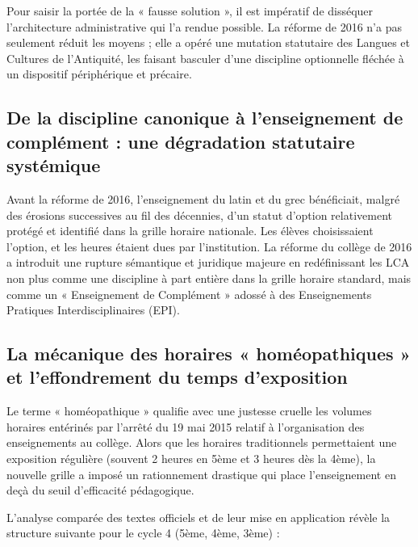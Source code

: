 Pour saisir la portée de la « fausse solution », il est impératif de disséquer l'architecture
administrative qui l'a rendue possible. La réforme de 2016 n'a pas seulement réduit les moyens ;
elle a opéré une mutation statutaire des Langues et Cultures de l'Antiquité, les faisant basculer
d'une discipline optionnelle fléchée à un dispositif périphérique et précaire.



\subsection{De la discipline canonique à l'enseignement de complément : une dégradation statutaire systémique}

Avant la réforme de 2016, l'enseignement du latin et du grec bénéficiait, malgré des érosions
successives au fil des décennies, d'un statut d'option relativement protégé et identifié dans la
grille horaire nationale. Les élèves choisissaient l'option, et les heures étaient dues par
l'institution. La réforme du collège de 2016 a introduit une rupture sémantique et juridique majeure
en redéfinissant les LCA non plus comme une discipline à part entière dans la grille horaire
standard, mais comme un « Enseignement de Complément » adossé à des Enseignements Pratiques
Interdisciplinaires (EPI).\cite{I-3-2-ref1}



\subsection{La mécanique des horaires « homéopathiques » et l'effondrement du temps d'exposition}

Le terme « homéopathique » qualifie avec une justesse cruelle les volumes horaires entérinés par
l'arrêté du 19 mai 2015 relatif à l'organisation des enseignements au collège. Alors que les
horaires traditionnels permettaient une exposition régulière (souvent 2 heures en 5ème et 3 heures
dès la 4ème), la nouvelle grille a imposé un rationnement drastique qui place l'enseignement en deçà
du seuil d'efficacité pédagogique.

L'analyse comparée des textes officiels et de leur mise en application révèle la structure suivante
pour le cycle 4 (5ème, 4ème, 3ème) :

